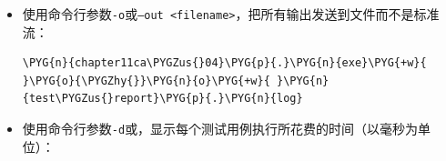 \begin{itemize}
\begin{codeblockbg}
\begin{Verbatim}[commandchars=\\\{\},breaklines=true,breakanywhere=true,fontsize=\codefont,xleftmargin=17bp]
\PYG{n+nl}{f}\PYG{p}{:}\PYG{err}{\PYGZbs{}}\PYG{n}{chapter11ca\PYGZus{}04}\PYG{err}{\PYGZbs{}}\PYG{n}{main}\PYG{p}{.}\PYG{n}{cpp}\PYG{p}{(}\PYG{l+m+mi}{16}\PYG{p}{)}\PYG{o}{:}
\PYG{n+nl}{FAILED}\PYG{p}{:}
\PYG{+w}{  }\PYG{n}{REQUIRE}\PYG{p}{(}\PYG{+w}{ }\PYG{n+nb}{false}\PYG{+w}{ }\PYG{p}{)}
\PYG{o}{=}\PYG{o}{=}\PYG{o}{=}\PYG{o}{=}\PYG{o}{=}\PYG{o}{=}\PYG{o}{=}\PYG{o}{=}\PYG{o}{=}\PYG{o}{=}\PYG{o}{=}\PYG{o}{=}\PYG{o}{=}\PYG{o}{=}\PYG{o}{=}\PYG{o}{=}\PYG{o}{=}\PYG{o}{=}\PYG{o}{=}\PYG{o}{=}\PYG{o}{=}\PYG{o}{=}\PYG{o}{=}\PYG{o}{=}\PYG{o}{=}\PYG{o}{=}\PYG{o}{=}\PYG{o}{=}\PYG{o}{=}\PYG{o}{=}\PYG{o}{=}\PYG{o}{=}\PYG{o}{=}\PYG{o}{=}\PYG{o}{=}\PYG{o}{=}\PYG{o}{=}\PYG{o}{=}\PYG{o}{=}\PYG{o}{=}\PYG{o}{=}\PYG{o}{=}\PYG{o}{=}\PYG{o}{=}\PYG{o}{=}\PYG{o}{=}\PYG{o}{=}\PYG{o}{=}\PYG{o}{=}\PYG{o}{=}
\PYG{n}{test}\PYG{+w}{ }\PYG{n}{cases}\PYG{o}{:}\PYG{+w}{ }\PYG{l+m+mi}{2}\PYG{+w}{ }\PYG{o}{|}\PYG{+w}{ }\PYG{l+m+mi}{1}\PYG{+w}{ }\PYG{n}{passed}\PYG{+w}{ }\PYG{o}{|}\PYG{+w}{ }\PYG{l+m+mi}{1}\PYG{+w}{ }\PYG{n}{failed}
\PYG{n+nl}{assertions}\PYG{p}{:}\PYG{+w}{ }\PYG{l+m+mi}{2}\PYG{+w}{ }\PYG{o}{|}\PYG{+w}{ }\PYG{l+m+mi}{1}\PYG{+w}{ }\PYG{n}{passed}\PYG{+w}{ }\PYG{o}{|}\PYG{+w}{ }\PYG{l+m+mi}{1}\PYG{+w}{ }\PYG{n}{failed}
\end{Verbatim}
\end{codeblockbg}



\item 使用命令行参数\texttt{-\allowbreak{}o}或\texttt{--\allowbreak{}out <\allowbreak{}filename>}，把所有输出发送到文件而不是标准流：



\begin{codeblockbg}
\begin{Verbatim}[commandchars=\\\{\},breaklines=true,breakanywhere=true,fontsize=\codefont,xleftmargin=17bp]
\PYG{n}{chapter11ca\PYGZus{}04}\PYG{p}{.}\PYG{n}{exe}\PYG{+w}{ }\PYG{o}{\PYGZhy{}}\PYG{n}{o}\PYG{+w}{ }\PYG{n}{test\PYGZus{}report}\PYG{p}{.}\PYG{n}{log}
\end{Verbatim}
\end{codeblockbg}



\item 使用命令行参数\texttt{-\allowbreak{}d}或，显示每个测试用例执行所花费的时间（以毫秒为单位）：




\end{itemize}
